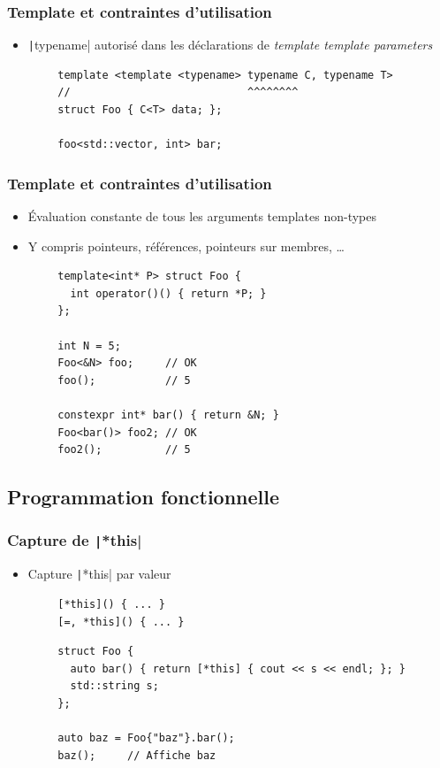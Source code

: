 \documentclass[C++.tex]{subfiles}
\begin{document}
\begin{frame}[fragile]
	\frametitle{Template et contraintes d'utilisation}
	\begin{itemize}
		\item \texttt|typename| autorisé dans les déclarations de \textit{template template parameters}
	\end{itemize}

	\begin{verbatim}
		template <template <typename> typename C, typename T>
		//                            ^^^^^^^^
		struct Foo { C<T> data; };

		foo<std::vector, int> bar;
	\end{verbatim}

\end{frame}

\begin{frame}[fragile]
	\frametitle{Template et contraintes d'utilisation}
	\begin{itemize}
		\item Évaluation constante de tous les arguments templates \og non-types\fg{}
		\item Y compris pointeurs, références, pointeurs sur membres, \ldots{}
	\end{itemize}

	\begin{verbatim}
		template<int* P> struct Foo { 
		  int operator()() { return *P; }
		};

		int N = 5;
		Foo<&N> foo;     // OK
		foo();           // 5

		constexpr int* bar() { return &N; }
		Foo<bar()> foo2; // OK
		foo2();          // 5
	\end{verbatim}
\end{frame}

\subsection*{Programmation fonctionnelle}
\begin{frame}[fragile]
	\frametitle{Capture de \texttt|*this|}
	\begin{itemize}
		\item Capture \texttt|*this| par valeur

	\end{itemize}

	\begin{verbatim}
		[*this]() { ... }
		[=, *this]() { ... }
	\end{verbatim}

	\begin{verbatim}
		struct Foo {
		  auto bar() { return [*this] { cout << s << endl; }; }
		  std::string s;
		};

		auto baz = Foo{"baz"}.bar();
		baz();     // Affiche baz
	\end{verbatim}
\end{frame}
\end{document}
